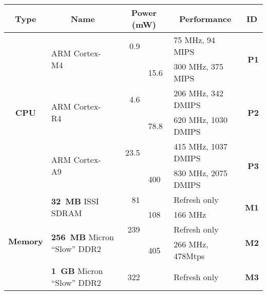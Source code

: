 \begin{table*}[t]
\begin{threeparttable}
{\footnotesize
\begin{tabularx}{\textwidth}{clrlXr}

\multicolumn{1}{c}{\textbf{\large{Type}}} &
\multicolumn{1}{c}{\textbf{\large{Name}}} &
\multicolumn{2}{c}{\textbf{\large{Power (mW)}}} &
\multicolumn{1}{c}{\textbf{\large{Performance}}} &
\multicolumn{1}{c}{\textbf{\large{ID}}}
\\ \toprule 

\multirow{6}{*}{\vspace{-0.15in}\textbf{CPU}} &
\multirow{2}{*}{ARM Cortex-M4\tnote{11}~\cite{cortexm4-web}} &
0.9\tnote{1} & &
75 MHz, 94 MIPS\tnote{2} &
\multirow{2}{*}{\textbf{P1}}
\\

& & &
15.6 &
300 MHz, 375 MIPS
&
\\ \cmidrule(l){2-6}

& \multirow{2}{*}{ARM Cortex-R4\tnote{11}~\cite{cortexr4-web}} &
4.6\tnote{1} & &
206 MHz, 342 DMIPS\tnote{2} &
\multirow{2}{*}{\textbf{P2}}
\\

& & &
78.8 &
620 MHz, 1030 DMIPS
&
\\ \cmidrule(l){2-6}

& \multirow{2}{*}{ARM Cortex-A9~\cite{cortexa9-web}} &
23.5\tnote{1} & &
415 MHz, 1037 DMIPS\tnote{2} &
\multirow{2}{*}{\textbf{P3}}
\\

& & &
400 &
830 MHz, 2075 DMIPS
&
\\ \toprule

\multirow{8}{*}{\vspace*{-0.15in}\textbf{Memory}} &
\multirow{2}{*}{\textbf{32~MB} ISSI SDRAM~\cite{issi32MBsdram-datasheet}} &
81 & &
Refresh only &
\multirow{2}{*}{\textbf{M1}}
\\

& & &
108 &
166 MHz
&
\\ \cmidrule(l){2-6}

&
\multirow{2}{*}{\textbf{256~MB} Micron ``Slow'' DDR2} &
239\tnote{10} & &
Refresh only &
\multirow{2}{*}{\textbf{M2}}
\\

& & &
405 &
266 MHz, 478Mtps
&
\\ \cmidrule(l){2-6}

&
\multirow{2}{*}{\textbf{1~GB} Micron ``Slow'' DDR2} &
322\tnote{10} & &
Refresh only &
\multirow{2}{*}{\textbf{M3}}
\\


\end{tabularx}}
\end{threeparttable}
\end{table*}

